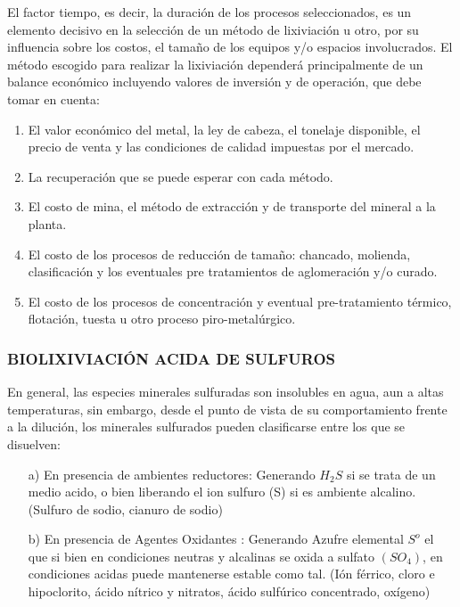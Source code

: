 El factor tiempo, es decir, la duraci\'on de los procesos seleccionados, es un elemento decisivo en la selecci\'on de un m\'etodo de lixiviaci\'on u otro, por su influencia sobre los costos, el tama\~no de los equipos y/o espacios involucrados.
El m\'etodo escogido para realizar la lixiviaci\'on depender\'a principalmente de un balance econ\'omico incluyendo valores de inversi\'on y de operaci\'on, que debe tomar en cuenta:
\begin{enumerate}
 \item El valor econ\'omico del metal, la ley de cabeza, el tonelaje disponible, el precio de venta y las condiciones de calidad impuestas por el mercado.
 \item  La recuperaci\'on que se puede esperar con cada m\'etodo.
 \item   El costo de mina, el m\'etodo de extracci\'on y de transporte del mineral a la planta.
 \item   El costo de los procesos de reducci\'on de tama\~no: chancado, molienda, clasificaci\'on y los eventuales pre tratamientos de aglomeraci\'on y/o curado.
 \item  El costo de los procesos de concentraci\'on y eventual pre-tratamiento t\'ermico, flotaci\'on, tuesta u otro proceso piro-metal\'urgico.
\end{enumerate}


\subsubsection{BIOLIXIVIACI\'ON ACIDA DE SULFUROS}

En general, las especies minerales sulfuradas son insolubles en agua, aun a altas temperaturas, sin embargo, desde el punto de vista de su comportamiento frente a la diluci\'on, los minerales sulfurados pueden clasificarse entre los que se disuelven:
\begin{enumerate}
 \item[a)] En presencia de ambientes reductores: Generando $H_2S$ si se trata de un medio acido, o bien liberando el ion sulfuro (S) si es ambiente alcalino. (Sulfuro de sodio, cianuro de sodio)

\item[b)] En presencia de Agentes Oxidantes : Generando Azufre elemental $S^o$ el que si bien en condiciones neutras y alcalinas se oxida a sulfato $(SO_4)$, en condiciones acidas puede mantenerse estable como tal. (I\'on f\'errico, cloro e hipoclorito, \'acido nítrico y nitratos, \'acido sulf\'urico concentrado, ox\'igeno)
\end{enumerate}

